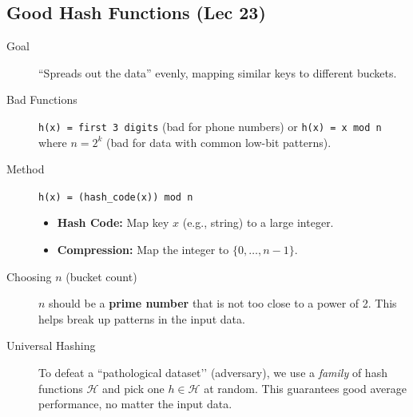 \subsection{Good Hash Functions (Lec 23)}
\begin{description}
    \item[Goal] ``Spreads out the data'' evenly, mapping similar keys to different buckets.
    
    \item[Bad Functions] 
    \texttt{h(x) = first 3 digits} (bad for phone numbers) or 
    \texttt{h(x) = x mod n} where $n = 2^k$ (bad for data with common low-bit patterns).
    
    \item[Method] \texttt{h(x) = (hash\_code(x)) mod n}
    \begin{itemize}
        \item \textbf{Hash Code:} Map key $x$ (e.g., string) to a large integer.
        \item \textbf{Compression:} Map the integer to $\{0, \dots, n-1\}$.
    \end{itemize}
    
    \item[Choosing $n$ (bucket count)] 
    $n$ should be a \textbf{prime number} that is not too close to a power of 2.  
    This helps break up patterns in the input data.
    
    \item[Universal Hashing] 
    To defeat a ``pathological dataset’’ (adversary), we use a \textit{family} of hash functions $\mathcal{H}$ and pick one $h \in \mathcal{H}$ at random.  
    This guarantees good average performance, no matter the input data.
\end{description}
